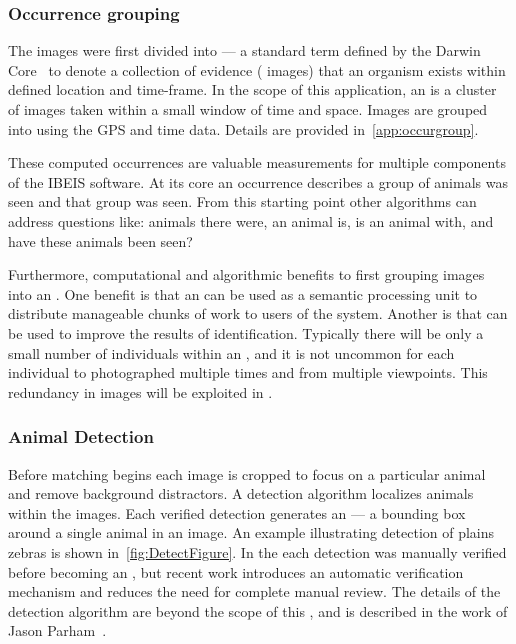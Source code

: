         \subsubsection{Occurrence grouping}
            The images were first divided into \glossterm{\occurrences{}} --- a standard term defined by the Darwin
            Core~\cite{wieczorek_darwin_2012} to denote a collection of evidence (\eg{} images) that an organism exists
            within defined location and time-frame. In the scope of this application, an \occurrence{} is a cluster of
            images taken within a small window of time and space. Images are grouped into \occurrences{} using the GPS
            and time data. Details are provided in~\cref{app:occurgroup}.

            These computed occurrences are valuable measurements for multiple components of the IBEIS software.
            At its core an occurrence describes  a group of animals was seen and  that
              group was seen.
            From this starting point other algorithms can address questions like:
             animals there were,  an animal is,  is an animal with,
              and  have these animals been seen?
            
            Furthermore, computational and algorithmic benefits to first grouping images into an \occurrence{}.
            One benefit is that an \occurrence{} can be used as a semantic processing unit to distribute
              manageable chunks of work to users of the system.
            Another is that \occurrences{} can be used to improve the results of identification.
            Typically there will be only a small number of individuals within an \occurrence{}, and it is not
              uncommon for each individual to photographed multiple times and from multiple viewpoints.
            This redundancy in images will be exploited in .

        \subsubsection{Animal Detection}
            Before matching begins each image is cropped to focus on a particular animal and remove background
            distractors. A detection algorithm localizes animals within the images. Each verified detection generates an
            \glossterm{\annot{}} --- a bounding box around a single animal in an image. An example illustrating
            detection of plains zebras is shown in~\cref{fig:DetectFigure}. In the \GZC{} each detection was manually
            verified before becoming an \annot{}, but recent work introduces an automatic verification mechanism and
            reduces the need for complete manual review. The details of the detection algorithm are beyond the scope of
            this \thesis{}, and is described in the work of Jason Parham~\cite{parham_photographic_2015,parham_detecting_2016}.


